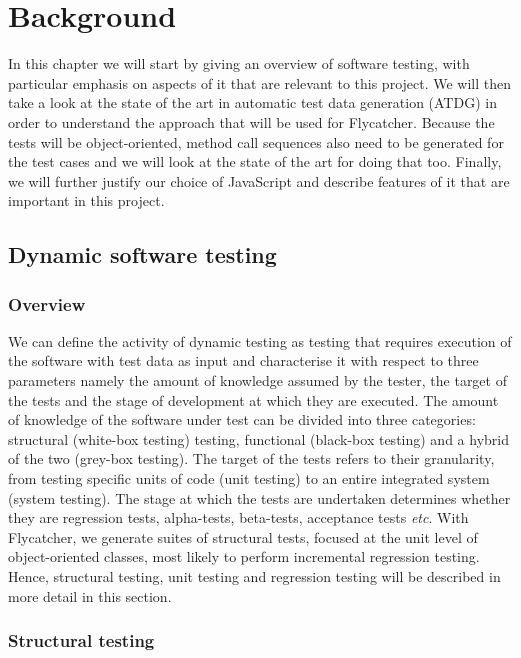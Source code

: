\chapter{Background}
\label{background}

In this chapter we will start by giving an overview of software testing, with particular emphasis on aspects of it that are relevant to this project. We will then take a look at the state of the art in automatic test data generation (ATDG) in order to understand the approach that will be used for \textsf{Flycatcher}. Because the tests will be object-oriented, method call sequences also need to be generated for the test cases and we will look at the state of the art for doing that too. Finally, we will further justify our choice of JavaScript and describe features of it that are important in this project.

\section{Dynamic software testing}

\subsection{Overview}

We can define the activity of dynamic testing as testing that requires execution of the software with test data as input \cite{mahmood2007systematic} and characterise it with respect to three parameters namely the amount of knowledge assumed by the tester, the target of the tests and the stage of development at which they are executed. The amount of knowledge of the software under test can be divided into three categories: structural (white-box testing) testing, functional (black-box testing) and a hybrid of the two (grey-box testing). The target of the tests refers to their granularity, from testing specific units of code (unit testing) to an entire integrated system (system testing). The stage at which the tests are undertaken determines whether they are regression tests, alpha-tests, beta-tests, acceptance tests \emph{etc}. With \textsf{Flycatcher}, we generate suites of structural tests, focused at the unit level of object-oriented classes, most likely to perform incremental regression testing. Hence, structural testing, unit testing and regression testing will be described in more detail in this section.

\subsection{Structural testing}

